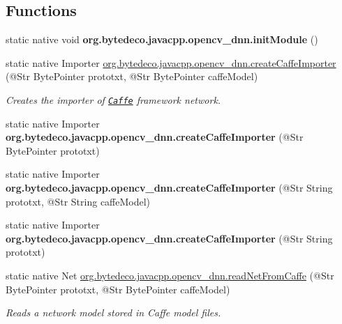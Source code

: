 \subsection*{Functions}
\begin{DoxyCompactItemize}
\item 
\mbox{\label{group__dnn_ga4e29f7e6a110c3f5aba11c6c28876dfb}} 
static native void {\bfseries org.\+bytedeco.\+javacpp.\+opencv\+\_\+dnn.\+init\+Module} ()
\item 
static native Importer \hyperlink{group__dnn_ga277fa41c30459c131b646bdb8951d82b}{org.\+bytedeco.\+javacpp.\+opencv\+\_\+dnn.\+create\+Caffe\+Importer} (@Str Byte\+Pointer prototxt, @Str Byte\+Pointer caffe\+Model)
\begin{DoxyCompactList}\small\item\em Creates the importer of \href{http://caffe.berkeleyvision.org}{\tt Caffe} framework network. \end{DoxyCompactList}\item 
\mbox{\label{group__dnn_gabf5c6728508e1462d422caae5e54717d}} 
static native Importer {\bfseries org.\+bytedeco.\+javacpp.\+opencv\+\_\+dnn.\+create\+Caffe\+Importer} (@Str Byte\+Pointer prototxt)
\item 
\mbox{\label{group__dnn_gaf52f221cfc0cce4ad89641f976309f7b}} 
static native Importer {\bfseries org.\+bytedeco.\+javacpp.\+opencv\+\_\+dnn.\+create\+Caffe\+Importer} (@Str String prototxt, @Str String caffe\+Model)
\item 
\mbox{\label{group__dnn_ga1eec0645176b06612e40bcc46be29b00}} 
static native Importer {\bfseries org.\+bytedeco.\+javacpp.\+opencv\+\_\+dnn.\+create\+Caffe\+Importer} (@Str String prototxt)
\item 
static native Net \hyperlink{group__dnn_ga228b1b00210018ec3f301f017a00949f}{org.\+bytedeco.\+javacpp.\+opencv\+\_\+dnn.\+read\+Net\+From\+Caffe} (@Str Byte\+Pointer prototxt, @Str Byte\+Pointer caffe\+Model)
\begin{DoxyCompactList}\small\item\em Reads a network model stored in Caffe model files. \end{DoxyCompactList}\item 
\mbox{\label{group__dnn_ga70b9f342a4480199f673419e67eadfbf}} 

\end{DoxyCompactItemize}
